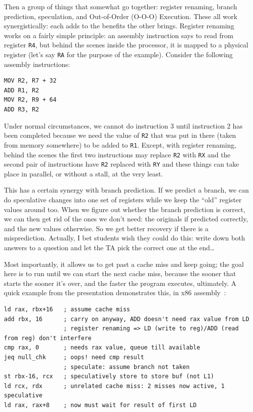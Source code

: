 Then a group of things that somewhat go together: register renaming, branch prediction, speculation, and Out-of-Order (O-O-O) Execution. These all work synergistically: each adds to the benefits the other brings. Register renaming works on a fairly simple principle: an assembly instruction says to read from register \texttt{R4}, but behind the scenes inside the processor, it is mapped to a physical register (let's say \texttt{RA} for the purpose of the example). Consider the following assembly instructions:

\begin{verbatim}
MOV R2, R7 + 32
ADD R1, R2
MOV R2, R9 + 64
ADD R3, R2
\end{verbatim}

Under normal circumstances, we cannot do instruction 3 until instruction 2 has been completed because we need the value of \texttt{R2} that was put in there (taken from memory somewhere) to be added to \texttt{R1}. Except, with register renaming, behind the scenes the first two instructions may replace \texttt{R2} with \texttt{RX} and the second pair of instructions have \texttt{R2} replaced with \texttt{RY} and these things can take place in parallel, or without a stall, at the very least.

This has a certain synergy with branch prediction. If we predict a branch, we can do speculative changes into one set of registers while we keep the ``old'' register values around too. When we figure out whether the branch prediction is correct, we can then get rid of the ones we don't need: the originals if predicted correctly, and the new values otherwise. So we get better recovery if there is a misprediction. Actually, I bet students wish they could do this: write down both answers to a question and let the TA pick the correct one at the end\ldots

Most importantly, it allows us to get past a cache miss and keep going; the goal here is to run until we can start the next cache miss, because the sooner that starts the sooner it's over, and the faster the program executes, ultimately. A quick example from the presentation demonstrates this, in x86 assembly~\cite{modern-hardware}:

\begin{verbatim}
ld rax, rbx+16   ; assume cache miss
add rbx, 16      ; carry on anyway, ADD doesn't need rax value from LD
                 ; register renaming => LD (write to reg)/ADD (read from reg) don't interfere
cmp rax, 0       ; needs rax value, queue till available
jeq null_chk     ; oops! need cmp result
                 ; speculate: assume branch not taken
st rbx-16, rcx   ; speculatively store to store buf (not L1)
ld rcx, rdx      ; unrelated cache miss: 2 misses now active, 1 speculative
ld rax, rax+8    ; now must wait for result of first LD
\end{verbatim}

